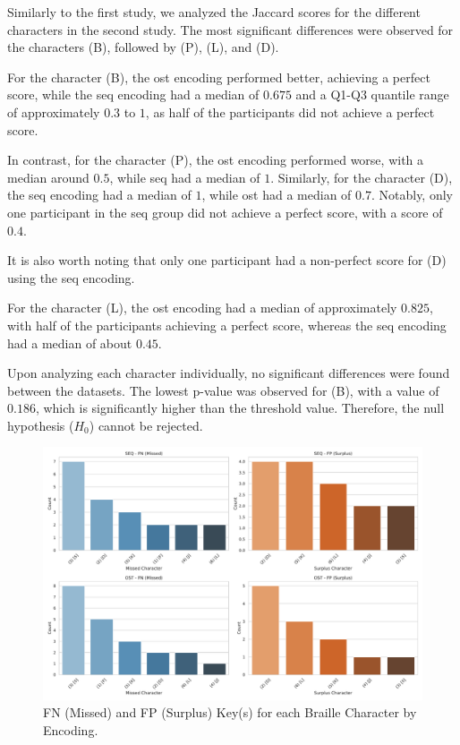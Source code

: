 Similarly to the first study, we analyzed the Jaccard scores for the different characters in the second study. The most significant differences were observed for the characters (B), followed by (P), (L), and (D).

For the character (B), the \gls{ost} encoding performed better, achieving a perfect score, while the \gls{seq} encoding had a median of $0.675$ and a Q1-Q3 quantile range of approximately $0.3$ to $1$, as half of the participants did not achieve a perfect score.

In contrast, for the character (P), the \gls{ost} encoding performed worse, with a median around $0.5$, while \gls{seq} had a median of $1$. Similarly, for the character (D), the \gls{seq} encoding had a median of $1$, while \gls{ost} had a median of $0.7$. Notably, only one participant in the \gls{seq} group did not achieve a perfect score, with a score of $0.4$.

It is also worth noting that only one participant had a non-perfect score for (D) using the \gls{seq} encoding.

For the character (L), the \gls{ost} encoding had a median of approximately $0.825$, with half of the participants achieving a perfect score, whereas the \gls{seq} encoding had a median of about $0.45$.

Upon analyzing each character individually, no significant differences were found between the datasets. The lowest p-value was observed for (B), with a value of $0.186$, which is significantly higher than the threshold value. Therefore, the null hypothesis ($H_0$) cannot be rejected.

\begin{figure}
    \centering
    \includegraphics[width=\linewidth]{src/pictures/Study2Data_Experiment/missed_surplus_test_study2.pdf}
    \caption{FN (Missed) and FP (Surplus) Key(s) for each Braille Character by Encoding.}
    \label{fig:missedSurplus_study2}
\end{figure}

